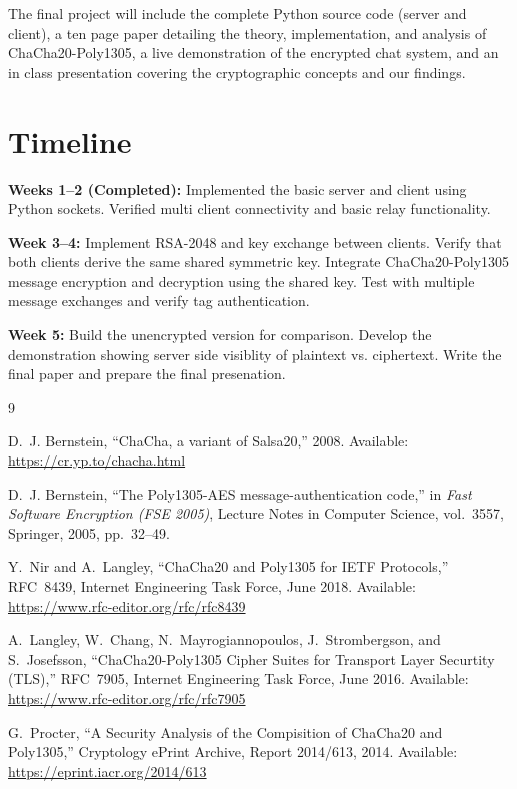 \documentclass[12pt]{article}
\begin{document}
    The final project will include the complete Python source code (server and client), a ten page paper detailing the theory, implementation, and analysis of ChaCha20-Poly1305, a live demonstration of the encrypted chat system, and an in class presentation covering the cryptographic concepts and our findings.

\section{Timeline}

    \textbf{Weeks 1--2 (Completed):} Implemented the basic server and client using Python sockets. Verified multi client connectivity and basic relay functionality.

    \textbf{Week 3--4:} Implement RSA-2048 and key exchange between clients. Verify that both clients derive the same shared symmetric key. Integrate ChaCha20-Poly1305 message encryption and decryption using the shared key. Test with multiple message exchanges and verify tag authentication.

    \textbf{Week 5:} Build the unencrypted version for comparison. Develop the demonstration showing server side visiblity of plaintext vs. ciphertext. Write the final paper and prepare the final presenation.

\begin{thebibliography}{9}

        D.~J. Bernstein,
        ``ChaCha, a variant of Salsa20,''
        2008.
        Available: \url{https://cr.yp.to/chacha.html}

        D.~J. Bernstein,
        ``The Poly1305-AES message-authentication code,''
        in \textit{Fast Software Encryption (FSE 2005)},
        Lecture Notes in Computer Science, vol.~3557,
        Springer, 2005, pp.~32--49.

        Y.~Nir and A.~Langley,
        ``ChaCha20 and Poly1305 for IETF Protocols,''
        RFC~8439, Internet Engineering Task Force, June 2018.
        Available: \url{https://www.rfc-editor.org/rfc/rfc8439}

        A.~Langley, W.~Chang, N.~Mayrogiannopoulos,
        J.~Strombergson, and S.~Josefsson,
        ``ChaCha20-Poly1305 Cipher Suites for Transport Layer
        Securtity (TLS),''
        RFC~7905, Internet Engineering Task Force, June 2016.
        Available: \url{https://www.rfc-editor.org/rfc/rfc7905}

        G.~Procter,
        ``A Security Analysis of the Compisition of ChaCha20
        and Poly1305,''
        Cryptology ePrint Archive, Report 2014/613, 2014.
        Available: \url{https://eprint.iacr.org/2014/613}

\end{thebibliography}
\end{document}
